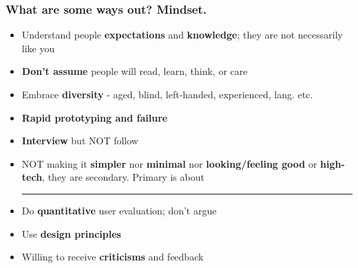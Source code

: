 \documentclass{beamer}
\begin{document}
\begin{frame}
\frametitle{What are some ways out? Mindset.}
\begin{itemize}
	\item Understand people \textbf{expectations} and \textbf{knowledge}; they are not necessarily like you
	\item \textbf{Don't assume} people will read, learn, think, or care
	\item Embrace \textbf{diversity} - aged, blind, left-handed, experienced,  lang. etc.
	\item  \textbf{Rapid prototyping and failure}
	\item \textbf{Interview} but NOT follow
	\item NOT making it \textbf{simpler} nor \textbf{minimal} nor \textbf{ looking/feeling good} or \textbf{high-tech},  they are secondary.  Primary is about \rule{2cm}{0.15mm}
	\item Do \textbf{quantitative} user evaluation; don't argue
	\item Use \textbf{design principles}
	\item Willing to receive \textbf{criticisms} and feedback
\end{itemize}
\end{frame}


\end{document}
